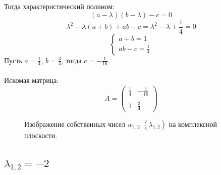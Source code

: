 \documentclass[a5paper, 10pt]{article}
\theoremstyle{definition}
\theoremstyle{plain}
\theoremstyle{remark}
\begin{document}
Тогда характеристический полином:
\begin{equation}
\left( a - \lambda \right) \left( b - \lambda \right) - c = 0
\end{equation}
\begin{equation}
\lambda^ 2 - \lambda (a + b ) + ab - c = \lambda^2 - \lambda + \frac{1}{4} = 0
\end{equation}
\begin{equation}
\begin{cases}
a + b = 1\\
ab - c =  \frac{1}{4}
\end{cases}
\end{equation}
Пусть $a = \frac{1}{4}$, $b = \frac{3}{4}$, тогда $c = -\frac{1}{16}$. \\
\\
Искомая матрица:
\begin{equation}
A =
\begin{pmatrix}
  \frac{1}{4} &  -\frac{1}{16}\\
\\
1 & \frac{3}{4}
\end{pmatrix}
\end{equation}
\begin{figure}[h!]
\caption{Изображение собственных чисел $w_{1, 2} \, \, \left( \lambda_{1, 2} \right)$ на комплексной плоскости.}
\end{figure}



\newpage
\subsection{$\lambda_{1, 2} = -2$}
\end{document}

